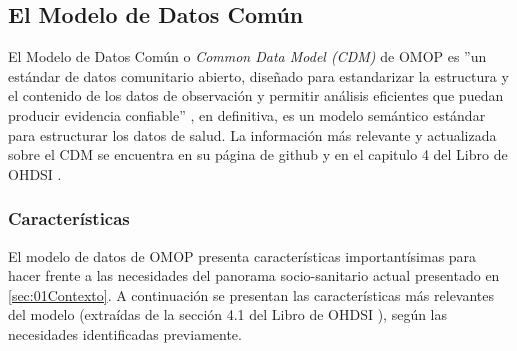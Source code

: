 \subsection{El Modelo de Datos Común} \label{subsec:05cdm}

El Modelo de Datos Común o \textit{Common Data Model (CDM)} de OMOP es ''un estándar de datos comunitario abierto, diseñado para estandarizar la estructura y el contenido de los datos de observación y permitir análisis eficientes que puedan producir evidencia confiable'' \cite{gitPagesCMD}, en definitiva, es un modelo semántico estándar para estructurar los datos de salud. La información más relevante y actualizada sobre el CDM se encuentra en su página de github \cite{gitPagesCMD} y en el capitulo 4 del Libro de OHDSI \cite{OHDSIbook}.

\subsubsection{Características}

El modelo de datos de OMOP presenta características importantísimas para hacer frente a las necesidades del panorama socio-sanitario actual presentado en \ref{sec:01Contexto}. A continuación se presentan las características más relevantes del modelo (extraídas de la sección  4.1 del Libro de OHDSI \cite{OHDSIbook}), según las necesidades identificadas previamente.

